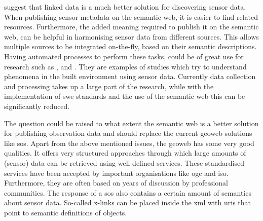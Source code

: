\citeauthor{SSW:Atkinson} suggest that linked data is a much better solution for discovering sensor data. When publishing sensor metadata on the semantic web, it is easier to find related resources. Furthermore, the added meaning required to publish it on the semantic web, can be helpful in harmonising sensor data from different sources. This allows multiple sources to be integrated on-the-fly, based on their semantic descriptions. Having automated processes to perform these tasks, could be of great use for research such as \cite{UC:vanderHoeven}, \cite{UC:Hotterdam} and \cite{UC:Theunisse}. They are examples of studies which try to understand phenomena in the built environment using sensor data. Currently data collection and processing takes up a large part of the research, while with the implementation of \ac{swe} standards and the use of the semantic web this can be significantly reduced.  


The question could be raised to what extent the semantic web is a better solution for publishing observation data and should replace the current geoweb solutions like \ac{sos}. Apart from the above mentioned issues, the geoweb has some very good qualities. It offers very structured approaches through which large amounts of (sensor) data can be retrieved using well defined services. These standardised services have been accepted by important organisations like \ac{ogc} and \ac{iso}. Furthermore, they are often based on years of discussion by professional communities. The response of a \ac{sos} also contains a certain amount of semantics about sensor data. So-called x-links can be placed inside the \ac{xml} with \ac{uri}s that point to semantic definitions of objects. 

